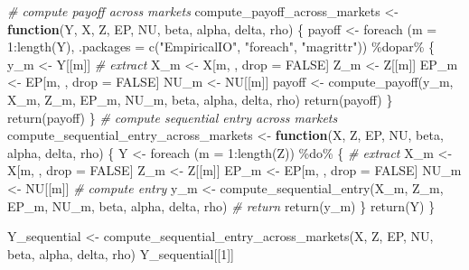 \documentclass[
]{article}
\newenvironment{Shaded}{\begin{snugshade}}{\end{snugshade}}
\newcommand{\AttributeTok}[1]{\textcolor[rgb]{0.77,0.63,0.00}{#1}}
\newcommand{\CommentTok}[1]{\textcolor[rgb]{0.56,0.35,0.01}{\textit{#1}}}
\newcommand{\ConstantTok}[1]{\textcolor[rgb]{0.00,0.00,0.00}{#1}}
\newcommand{\ControlFlowTok}[1]{\textcolor[rgb]{0.13,0.29,0.53}{\textbf{#1}}}
\newcommand{\DecValTok}[1]{\textcolor[rgb]{0.00,0.00,0.81}{#1}}
\newcommand{\FunctionTok}[1]{\textcolor[rgb]{0.00,0.00,0.00}{#1}}
\newcommand{\NormalTok}[1]{#1}
\newcommand{\OtherTok}[1]{\textcolor[rgb]{0.56,0.35,0.01}{#1}}
\newcommand{\SpecialCharTok}[1]{\textcolor[rgb]{0.00,0.00,0.00}{#1}}
\newcommand{\StringTok}[1]{\textcolor[rgb]{0.31,0.60,0.02}{#1}}
\begin{document}
\begin{Shaded}
\begin{Highlighting}[]
\CommentTok{\# compute payoff across markets}
\NormalTok{compute\_payoff\_across\_markets }\OtherTok{\textless{}{-}}
  \ControlFlowTok{function}\NormalTok{(Y, X, Z, EP, NU, beta, alpha, delta, rho) \{}
\NormalTok{    payoff }\OtherTok{\textless{}{-}}
      \FunctionTok{foreach}\NormalTok{ (}\AttributeTok{m =} \DecValTok{1}\SpecialCharTok{:}\FunctionTok{length}\NormalTok{(Y), }\AttributeTok{.packages =} \FunctionTok{c}\NormalTok{(}\StringTok{"EmpiricalIO"}\NormalTok{, }\StringTok{"foreach"}\NormalTok{, }\StringTok{"magrittr"}\NormalTok{)) }\SpecialCharTok{\%dopar\%}\NormalTok{ \{}
\NormalTok{        y\_m }\OtherTok{\textless{}{-}}\NormalTok{ Y[[m]]}
        \CommentTok{\# extract}
\NormalTok{        X\_m }\OtherTok{\textless{}{-}}\NormalTok{ X[m, , drop }\OtherTok{=} \ConstantTok{FALSE}\NormalTok{]}
\NormalTok{        Z\_m }\OtherTok{\textless{}{-}}\NormalTok{ Z[[m]]}
\NormalTok{        EP\_m }\OtherTok{\textless{}{-}}\NormalTok{ EP[m, , drop }\OtherTok{=} \ConstantTok{FALSE}\NormalTok{]}
\NormalTok{        NU\_m }\OtherTok{\textless{}{-}}\NormalTok{ NU[[m]]}
\NormalTok{        payoff }\OtherTok{\textless{}{-}} \FunctionTok{compute\_payoff}\NormalTok{(y\_m, X\_m, Z\_m, EP\_m, NU\_m, beta, alpha, delta, rho)}
        \FunctionTok{return}\NormalTok{(payoff)}
\NormalTok{      \}}
    \FunctionTok{return}\NormalTok{(payoff)}
\NormalTok{  \}}
\CommentTok{\# compute sequential entry across markets}
\NormalTok{compute\_sequential\_entry\_across\_markets }\OtherTok{\textless{}{-}}
  \ControlFlowTok{function}\NormalTok{(X, Z, EP, NU, beta, alpha, delta, rho) \{}
\NormalTok{    Y }\OtherTok{\textless{}{-}}
      \FunctionTok{foreach}\NormalTok{ (}\AttributeTok{m =} \DecValTok{1}\SpecialCharTok{:}\FunctionTok{length}\NormalTok{(Z)) }\SpecialCharTok{\%do\%}\NormalTok{ \{}
        \CommentTok{\# extract}
\NormalTok{        X\_m }\OtherTok{\textless{}{-}}\NormalTok{ X[m, , drop }\OtherTok{=} \ConstantTok{FALSE}\NormalTok{]}
\NormalTok{        Z\_m }\OtherTok{\textless{}{-}}\NormalTok{ Z[[m]]}
\NormalTok{        EP\_m }\OtherTok{\textless{}{-}}\NormalTok{ EP[m, , drop }\OtherTok{=} \ConstantTok{FALSE}\NormalTok{]}
\NormalTok{        NU\_m }\OtherTok{\textless{}{-}}\NormalTok{ NU[[m]]}
        \CommentTok{\# compute entry}
\NormalTok{        y\_m }\OtherTok{\textless{}{-}} \FunctionTok{compute\_sequential\_entry}\NormalTok{(X\_m, Z\_m, EP\_m, NU\_m, beta, alpha, delta, rho)}
        \CommentTok{\# return}
        \FunctionTok{return}\NormalTok{(y\_m)}
\NormalTok{      \}}
    \FunctionTok{return}\NormalTok{(Y)}
\NormalTok{  \}}

\NormalTok{Y\_sequential }\OtherTok{\textless{}{-}}
  \FunctionTok{compute\_sequential\_entry\_across\_markets}\NormalTok{(X, Z, EP, NU, beta, alpha, delta, rho)}
\NormalTok{Y\_sequential[[}\DecValTok{1}\NormalTok{]]}
\end{Highlighting}
\end{Shaded}
\end{document}
